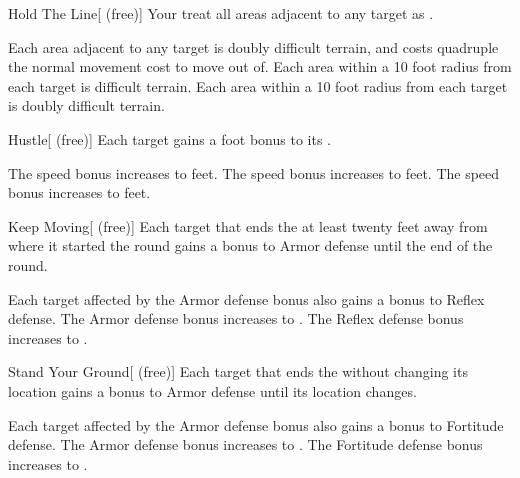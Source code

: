 {            \begin{freeability}{Hold The Line}[ (free)]
                Your  treat all areas adjacent to any target as .

                \rankline
                 Each area adjacent to any target is doubly difficult terrain, and costs quadruple the normal movement cost to move out of.
                 Each area within a 10 foot radius  from each target is difficult terrain.
                 Each area within a 10 foot radius  from each target is doubly difficult terrain.
            \end{freeability}

            \begin{freeability}{Hustle}[ (free)]
                Each target gains a  foot bonus to its .

                \rankline
                 The speed bonus increases to  feet.
                 The speed bonus increases to  feet.
                 The speed bonus increases to  feet.
            \end{freeability}

            \begin{freeability}{Keep Moving}[ (free)]
                Each target that ends the  at least twenty feet away from where it started the round
                    gains a  bonus to Armor defense until the end of the round.

                \rankline
                 Each target affected by the Armor defense bonus also gains a  bonus to Reflex defense.
                 The Armor defense bonus increases to .
                 The Reflex defense bonus increases to .
            \end{freeability}

            \begin{freeability}{Stand Your Ground}[ (free)]
                Each target that ends the  without changing its location gains a  bonus to Armor defense until its location changes.

                \rankline
                 Each target affected by the Armor defense bonus also gains a  bonus to Fortitude defense.
                 The Armor defense bonus increases to .
                 The Fortitude defense bonus increases to .
            \end{freeability}
        }

